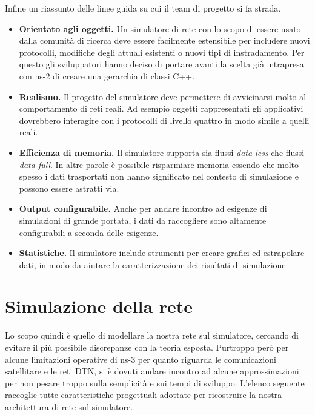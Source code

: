 \documentclass[12pt,a4paper,oneside]{book}
\begin{document}
		Infine un riassunto delle linee guida su cui il team di progetto si fa strada.
		
		\begin{itemize}
			\item {\bf Orientato agli oggetti.} Un simulatore di rete con lo scopo di essere usato dalla comunità di ricerca deve essere facilmente estensibile per includere nuovi protocolli, modifiche degli attuali esistenti o nuovi tipi di instradamento. Per questo gli sviluppatori hanno deciso di portare avanti la scelta già intrapresa con ns-2 di creare una gerarchia di classi C++.
			
			\item {\bf Realismo.} Il progetto del simulatore deve permettere di avvicinarsi molto al comportamento di reti reali. Ad esempio oggetti rappresentati gli applicativi dovrebbero interagire con i protocolli di livello quattro in modo simile a quelli reali.
			
			\item {\bf Efficienza di memoria.} Il simulatore supporta sia flussi {\it data-less} che flussi {\it data-full}. In altre parole è possibile risparmiare memoria essendo che molto spesso i dati trasportati non hanno significato nel contesto di simulazione e possono essere astratti via.
			
			\item {\bf Output configurabile.} Anche per andare incontro ad esigenze di simulazioni di grande portata, i dati da raccogliere sono altamente configurabili a seconda delle esigenze.
			
			\item {\bf Statistiche.} Il simulatore include strumenti per creare grafici ed estrapolare dati, in modo da aiutare la caratterizzazione dei risultati di simulazione.
		\end{itemize}
		
		\section{Simulazione della rete} \label{simRete}
		Lo scopo quindi è quello di modellare la nostra rete sul simulatore, cercando di evitare il più possibile discrepanze con la teoria esposta. Purtroppo però per alcune limitazioni operative di ns-3 per quanto riguarda le comunicazioni satellitare e le reti DTN, si è dovuti andare incontro ad alcune approssimazioni per non pesare troppo sulla semplicità e sui tempi di sviluppo. L'elenco seguente raccoglie tutte caratteristiche progettuali adottate per ricostruire la nostra architettura di rete sul simulatore. 
		
\end{document}

